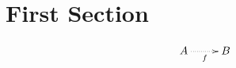 \documentclass{article}
\begin{document}
\section{First Section}
\begin{toappendix}
\begin{displaymath}
  \xymatrix{A\ar@{.>}[r]_f & B}
\end{displaymath}
\end{toappendix}
\end{document}
